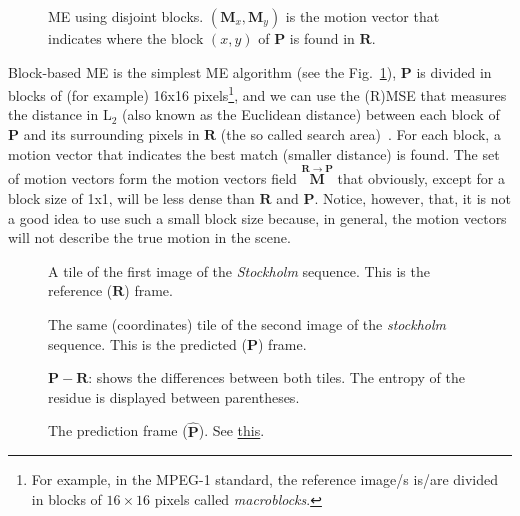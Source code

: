 \begin{figure}
  \centering
  \caption{ME using disjoint blocks. $({\mathbf M}_x, {\mathbf M}_y)$
    is the motion vector that indicates where the block $(x,y)$ of
    ${\mathbf P}$ is found in ${\mathbf R}$.}
  \label{fig:simple}
\end{figure}

Block-based ME is the simplest ME algorithm (see the
Fig.~\ref{fig:simple}), ${\mathbf P}$ is divided in blocks of (for
example) 16x16 pixels\footnote{For example, in the MPEG-1 standard,
  the reference image/s is/are divided in blocks of $16\times 16$
  pixels called \emph{macroblocks}.}, and we can use the (R)MSE that
measures the distance in L$_2$ (also known as the Euclidean distance)
between each block of ${\mathbf P}$ and its surrounding pixels in
${\mathbf R}$ (the so called search area)~\cite{zhu2000new}. For each
block, a motion vector that indicates the best match (smaller
distance) is found. The set of motion vectors form the motion vectors
field $\overset{{\mathbf R}\rightarrow {\mathbf P}}{\mathbf M}$ that
obviously, except for a block size of 1x1, will be less dense than
${\mathbf R}$ and ${\mathbf P}$. Notice, however, that, it is not a
good idea to use such a small block size because, in general, the
motion vectors will not describe the true motion in the scene.

\begin{figure}
  \centering
  \caption{A tile of the first image of the \emph{Stockholm}
    sequence. This is the reference (${\mathbf R}$) frame.}
  \label{fig:R_block}
\end{figure}

\begin{figure}
  \centering
  \caption{The same (coordinates) tile of the second image of the
    \emph{stockholm} sequence. This is the predicted (${\mathbf P}$)
    frame.}
  \label{fig:P_block}
\end{figure}

\begin{figure}
  \centering
  \caption{${\mathbf P} - {\mathbf R}$: shows the differences between
    both tiles. The entropy of the residue is displayed between
    parentheses.}
  \label{fig:RP_block}
\end{figure}

\begin{figure}
  \centering
  \caption{The prediction frame (${\hat{\mathbf P}}$). See \href{https://github.com/Sistemas-Multimedia/Sistemas-Multimedia.github.io/blob/master/milestones/09-ME/full_search_block_ME.ipynb}{this}.}
  \label{fig:hat_P_block}
\end{figure}

